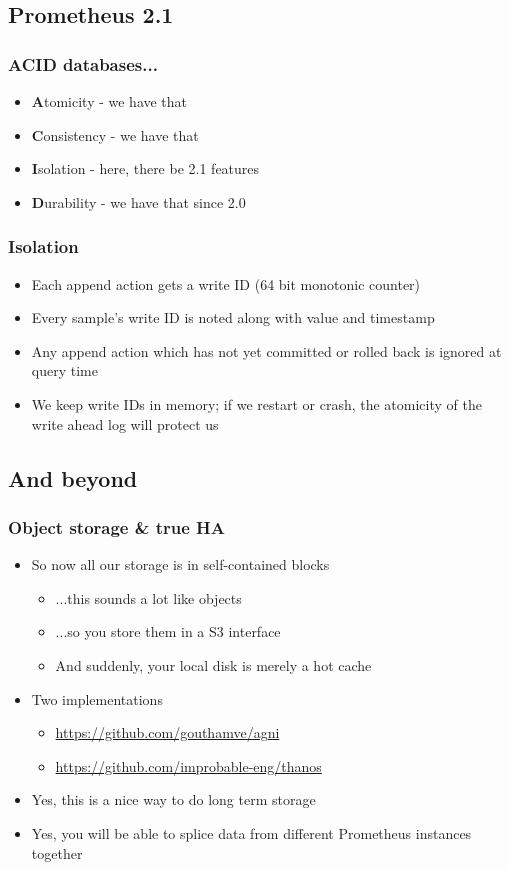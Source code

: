 \documentclass[t]{beamer}
\begin{document}
\subsection{Prometheus 2.1}

\begin{frame}
	\frametitle{ACID databases...}
	\begin{itemize}
		\item \textbf{A}tomicity - we have that
		\item \textbf{C}onsistency - we have that
		\item \textbf{I}solation - here, there be 2.1 features
		\item \textbf{D}urability - we have that since 2.0
	\end{itemize}
\end{frame}

\begin{frame}
	\frametitle{Isolation}
	\begin{itemize}
		\item Each append action gets a write ID (64 bit monotonic counter)
		\item Every sample's write ID is noted along with value and timestamp
		\item Any append action which has not yet committed or rolled back is ignored at query time
		\item We keep write IDs in memory; if we restart or crash, the atomicity of the write ahead log will protect us
	\end{itemize}
\end{frame}


\subsection{And beyond}

\begin{frame}
	\frametitle{Object storage \& true HA}
	\begin{itemize}
		\item So now all our storage is in self-contained blocks
		\begin{itemize}
			\item ...this sounds a lot like objects
			\item ...so you store them in a S3 interface
			\item And suddenly, your local disk is merely a hot cache
		\end{itemize}
		\item Two implementations
		\begin{itemize}
			\item \url{https://github.com/gouthamve/agni}
			\item \url{https://github.com/improbable-eng/thanos}
		\end{itemize}
		\item Yes, this is a nice way to do long term storage
		\item Yes, you will be able to splice data from different Prometheus instances together
	\end{itemize}
\end{frame}
\end{document}
